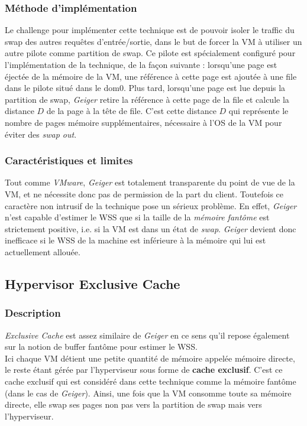 \subsubsection{Méthode d'implémentation}
Le challenge pour implémenter cette technique est de pouvoir isoler le traffic du swap des autres requêtes d'entrée/sortie, dans le but de forcer la VM à utiliser un autre pilote comme partition de swap. Ce pilote est spécialement configuré pour l'implémentation de la technique, de la façon suivante : lorsqu'une page est éjectée de la mémoire de la VM, une référence à cette page est ajoutée à une file dans le pilote situé dans le dom0. Plus tard, lorsqu'une page est lue depuis la partition de swap, \textit{Geiger} retire la référence à cette page de la file et calcule la distance $D$ de la page à la tête de file. C'est cette distance $D$ qui représente le nombre de pages mémoire supplémentaires, nécessaire à l'OS de la VM pour éviter des \textit{swap out}.

\subsubsection{Caractéristiques et limites}
Tout comme \textit{VMware}, \textit{Geiger} est totalement transparente du point de vue de la VM, et ne nécessite donc pas de permission de la part du client. Toutefois ce caractère non intrusif de la technique pose un sérieux problème. En effet, \textit{Geiger} n'est capable d'estimer le WSS que si la taille de la \textit{mémoire fantôme} est strictement positive, i.e. si la VM est dans un état de \textit{swap}. \textit{Geiger} devient donc inefficace si le WSS de la machine est inférieure à la mémoire qui lui est actuellement allouée.

\subsection{Hypervisor Exclusive Cache}

\subsubsection{Description}
\textit{Exclusive Cache} \cite{exclusive_cache} est assez similaire de \textit{Geiger} en ce sens qu'il repose également sur la notion de buffer fantôme pour estimer le WSS.\\
Ici chaque VM détient une petite quantité de mémoire appelée mémoire directe, le reste étant gérée par l'hyperviseur sous forme de \textbf{cache exclusif}. C'est ce cache exclusif qui est considéré dans cette technique comme la mémoire fantôme (dans le cas de \textit{Geiger}). Ainsi, une fois que la VM consomme toute sa mémoire directe, elle swap ses pages non pas vers la partition de swap mais vers l'hyperviseur.

